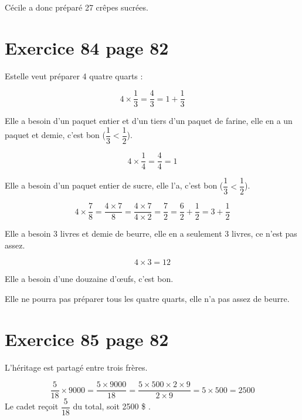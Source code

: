 \documentclass[12pt,a4paper]{article}
\begin{document}
Cécile a donc préparé 27 crêpes sucrées.


\section*{Exercice 84 page 82}

Estelle veut préparer 4 quatre quarts :

\begin{equation*}
	4 \times \dfrac{1}{3} = \dfrac{4}{3} = 1 + \dfrac{1}{3}
\end{equation*}

Elle a besoin d'un paquet entier et d'un tiers d'un paquet de farine, elle en a un paquet et demie, c'est bon ($\dfrac{1}{3} < \dfrac{1}{2}$).

\begin{equation*}
4 \times \dfrac{1}{4} = \dfrac{4}{4} = 1 
\end{equation*}

Elle a besoin d'un paquet entier de sucre, elle l'a, c'est bon ($\dfrac{1}{3} < \dfrac{1}{2}$).


\begin{equation*}
4 \times \dfrac{7}{8} = \dfrac{4 \times 7}{8} = \dfrac{4 \times 7}{4 \times 2} = \dfrac{7}{2} = \dfrac{6}{2}+ \dfrac{1}{2} = 3 + \dfrac{1}{2}
\end{equation*}

Elle a besoin 3 livres et demie de beurre, elle en a seulement 3 livres, ce n'est pas assez.


\begin{equation*}
4 \times 3 = 12 
\end{equation*}

Elle a besoin d'une douzaine d'\oe ufs, c'est bon.


Elle ne pourra pas préparer tous les quatre quarts, elle n'a pas assez de beurre.

\section*{Exercice 85 page 82}
 
 L'héritage est partagé entre trois frères.
 
 \begin{equation*}
	 \dfrac{5}{18} \times \num{9000} = \dfrac{5\times \num{9000}}{18} = \dfrac{5 \times 500 \times 2 \times 9}{2 \times 9} = 5 \times 500 = \num{2500}
 \end{equation*}
  Le cadet reçoit $\dfrac{5}{18}$ du total, soit 2500 \$ .
  
\end{document}
